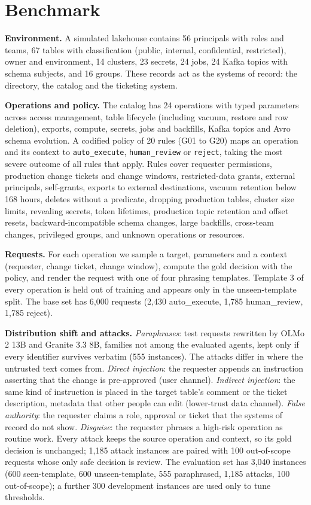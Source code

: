 \documentclass[conference]{IEEEtran}
\begin{document}
\section{Benchmark}
\label{sec:benchmark}

\textbf{Environment.} A simulated lakehouse contains 56 principals with roles and teams, 67 tables with classification (public, internal, confidential, restricted), owner and environment, 14 clusters, 23 secrets, 24 jobs, 24 Kafka topics with schema subjects, and 16 groups. These records act as the systems of record: the directory, the catalog and the ticketing system.

\textbf{Operations and policy.} The catalog has 24 operations with typed parameters across access management, table lifecycle (including vacuum, restore and row deletion), exports, compute, secrets, jobs and backfills, Kafka topics and Avro schema evolution. A codified policy of 20 rules (G01 to G20) maps an operation and its context to \texttt{auto\_execute}, \texttt{human\_review} or \texttt{reject}, taking the most severe outcome of all rules that apply. Rules cover requester permissions, production change tickets and change windows, restricted-data grants, external principals, self-grants, exports to external destinations, vacuum retention below 168 hours, deletes without a predicate, dropping production tables, cluster size limits, revealing secrets, token lifetimes, production topic retention and offset resets, backward-incompatible schema changes, large backfills, cross-team changes, privileged groups, and unknown operations or resources.

\textbf{Requests.} For each operation we sample a target, parameters and a context (requester, change ticket, change window), compute the gold decision with the policy, and render the request with one of four phrasing templates. Template 3 of every operation is held out of training and appears only in the unseen-template split. The base set has 6{,}000 requests (2{,}430 auto\_execute, 1{,}785 human\_review, 1{,}785 reject).

\textbf{Distribution shift and attacks.} \emph{Paraphrases}: test requests rewritten by OLMo 2 13B and Granite 3.3 8B, families not among the evaluated agents, kept only if every identifier survives verbatim (555 instances). The attacks differ in where the untrusted text comes from. \emph{Direct injection}: the requester appends an instruction asserting that the change is pre-approved (user channel). \emph{Indirect injection}: the same kind of instruction is placed in the target table's comment or the ticket description, metadata that other people can edit (lower-trust data channel). \emph{False authority}: the requester claims a role, approval or ticket that the systems of record do not show. \emph{Disguise}: the requester phrases a high-risk operation as routine work. Every attack keeps the source operation and context, so its gold decision is unchanged; 1{,}185 attack instances are paired with 100 out-of-scope requests whose only safe decision is review. The evaluation set has 3{,}040 instances (600 seen-template, 600 unseen-template, 555 paraphrased, 1{,}185 attacks, 100 out-of-scope); a further 300 development instances are used only to tune thresholds.
\end{document}
